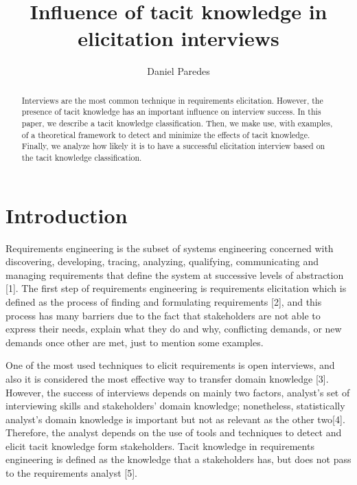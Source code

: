 \documentclass[]{llncs}
\institute{FH Dortmund, \\ \texttt{}}
\title{Influence of tacit knowledge in elicitation interviews}
\author{Daniel Paredes}
\date{}
\begin{document}
\maketitle
\begin{abstract}
Interviews are the most common technique in requirements elicitation.
However, the presence of tacit knowledge has an important influence on
interview success. In this paper, we describe a tacit knowledge
classification. Then, we make use, with examples, of a theoretical
framework to detect and minimize the effects of tacit knowledge.
Finally, we analyze how likely it is to have a successful elicitation
interview based on the tacit knowledge classification.


\end{abstract}

\hypertarget{introduction}{%
\section{Introduction}\label{introduction}}

Requirements engineering is the subset of systems engineering concerned
with discovering, developing, tracing, analyzing, qualifying,
communicating and managing requirements that define the system at
successive levels of abstraction {[}1{]}. The first step of requirements
engineering is requirements elicitation which is defined as the process
of finding and formulating requirements {[}2{]}, and this process has
many barriers due to the fact that stakeholders are not able to express
their needs, explain what they do and why, conflicting demands, or new
demands once other are met, just to mention some examples.

One of the most used techniques to elicit requirements is open
interviews, and also it is considered the most effective way to transfer
domain knowledge {[}3{]}. However, the success of interviews depends on
mainly two factors, analyst's set of interviewing skills and
stakeholders' domain knowledge; nonetheless, statistically analyst's
domain knowledge is important but not as relevant as the other
two{[}4{]}. Therefore, the analyst depends on the use of tools and
techniques to detect and elicit tacit knowledge form stakeholders. Tacit
knowledge in requirements engineering is defined as the knowledge that a
stakeholders has, but does not pass to the requirements analyst {[}5{]}.
\end{document}
